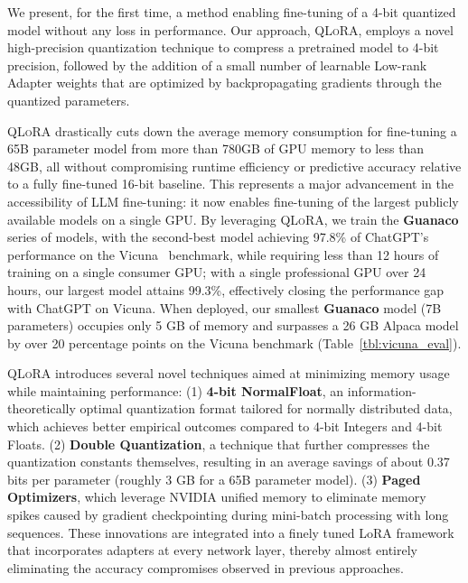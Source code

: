 We present, for the first time, a method enabling fine-tuning of a 4-bit quantized model without any loss in performance. Our approach, \textsc{QLoRA}, employs a novel high-precision quantization technique to compress a pretrained model to 4-bit precision, followed by the addition of a small number of learnable Low-rank Adapter weights \citep{hu2021lora} that are optimized by backpropagating gradients through the quantized parameters.

\textsc{QLoRA} drastically cuts down the average memory consumption for fine-tuning a 65B parameter model from more than 780GB of GPU memory to less than 48GB, all without compromising runtime efficiency or predictive accuracy relative to a fully fine-tuned 16-bit baseline. This represents a major advancement in the accessibility of LLM fine-tuning: it now enables fine-tuning of the largest publicly available models on a single GPU. By leveraging \textsc{QLoRA}, we train the \textbf{Guanaco} series of models, with the second-best model achieving 97.8\% of ChatGPT’s performance on the Vicuna~\citep{vicuna2023} benchmark, while requiring less than 12 hours of training on a single consumer GPU; with a single professional GPU over 24 hours, our largest model attains 99.3\%, effectively closing the performance gap with ChatGPT on Vicuna. When deployed, our smallest \textbf{Guanaco} model (7B parameters) occupies only 5 GB of memory and surpasses a 26 GB Alpaca model by over 20 percentage points on the Vicuna benchmark (Table~\ref{tbl:vicuna_eval}).

\textsc{QLoRA} introduces several novel techniques aimed at minimizing memory usage while maintaining performance: (1) \textbf{4-bit NormalFloat}, an information-theoretically optimal quantization format tailored for normally distributed data, which achieves better empirical outcomes compared to 4-bit Integers and 4-bit Floats. (2) \textbf{Double Quantization}, a technique that further compresses the quantization constants themselves, resulting in an average savings of about 0.37 bits per parameter (roughly 3 GB for a 65B parameter model). (3) \textbf{Paged Optimizers}, which leverage NVIDIA unified memory to eliminate memory spikes caused by gradient checkpointing during mini-batch processing with long sequences. These innovations are integrated into a finely tuned LoRA framework that incorporates adapters at every network layer, thereby almost entirely eliminating the accuracy compromises observed in previous approaches.

